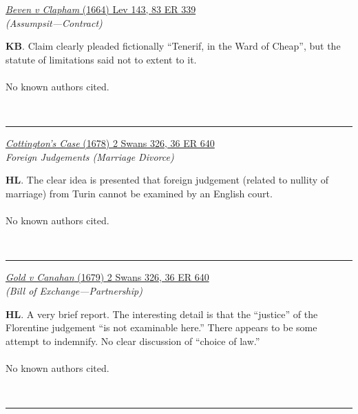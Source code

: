 \documentclass[twoside]{article}
\begin{document}
        \begin{small}
        \begin{center}
        \href{https://heinonline.org/HOL/P?h=hein.engrep/engrf0083&i=343}{\textit{Beven v Clapham} (1664) Lev 143, 83 ER 339} \label{15} \\ 
\textit{ (Assumpsit---Contract)}\\
        \end{center}
        \textbf{KB}. Claim clearly pleaded fictionally “Tenerif, in the Ward of Cheap”, but the statute of limitations said not to extent to it.\\\\No known authors cited.
        \end{small}\\
        \rule{\textwidth}{0.5pt}
        

        \begin{small}
        \begin{center}
        \href{https://heinonline.org/HOL/P?h=hein.engrep/engrc0036&i=649}{\textit{Cottington’s Case} (1678) 2 Swans 326, 36 ER 640} \label{8} \\ 
\textit{Foreign Judgements (Marriage Divorce)}\\
        \end{center}
        \textbf{HL}. The clear idea is presented that foreign judgement (related to nullity of marriage) from Turin cannot be examined by an English court.\\\\No known authors cited.
        \end{small}\\
        \rule{\textwidth}{0.5pt}
        

        \begin{small}
        \begin{center}
        \href{https://heinonline.org/HOL/P?h=hein.engrep/engrc0036&i=649}{\textit{Gold v Canahan} (1679) 2 Swans 326, 36 ER 640} \label{7} \\ 
\textit{ (Bill of Exchange---Partnership)}\\
        \end{center}
        \textbf{HL}. A very brief report. The interesting detail is that the “justice” of the Florentine judgement “is not examinable here.” There appears to be some attempt to indemnify. No clear discussion of “choice of law.”\\\\No known authors cited.
        \end{small}\\
        \rule{\textwidth}{0.5pt}
        
\end{document}
